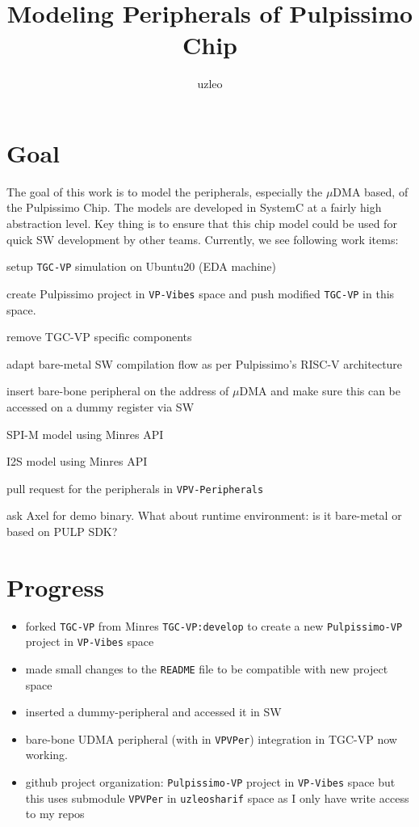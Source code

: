 \documentclass{article}
\title{Modeling Peripherals of Pulpissimo Chip}
\author{uzleo}
\date{}
\newcommand{\cmark}{\ding{51}}%
\newcommand{\done}{\rlap{$\square$}{\raisebox{2pt}{\large\hspace{1pt}\cmark}}%
\hspace{-2.5pt}}
\begin{document}
\maketitle


\section{Goal}
The goal of this work is to model the peripherals, especially the $\mu$DMA based, of the Pulpissimo Chip.
The models are developed in SystemC at a fairly high abstraction level. Key thing is to ensure that this
chip model could be used for quick SW development by other teams. Currently, we see following work items:

\begin{todolist}
 \item[\done] setup \texttt{TGC-VP} simulation on Ubuntu20 (EDA machine)
 \item[\done] create Pulpissimo project in \texttt{VP-Vibes} space and push modified \texttt{TGC-VP} in this space.
 \item remove TGC-VP specific components
 \item[\done] adapt bare-metal SW compilation flow as per Pulpissimo's RISC-V architecture
 \item[\done] insert bare-bone peripheral on the address of $\mu$DMA and make sure this can be accessed on a
 dummy register via SW
 \item SPI-M model using Minres API
 \item I2S model using Minres API
 \item[\done] pull request for the peripherals in \texttt{VPV-Peripherals}
 \item[\done] ask Axel for demo binary. What about runtime environment: is it bare-metal or based on PULP SDK?
\end{todolist}

\section{Progress}
\begin{itemize}
 \item forked \texttt{TGC-VP} from Minres \texttt{TGC-VP:develop} to create a new \texttt{Pulpissimo-VP} project in
       \texttt{VP-Vibes} space
 \item made small changes to the \texttt{README} file to be compatible with new project space
 \item inserted a dummy-peripheral and accessed it in SW
 \item bare-bone UDMA peripheral (with in \texttt{VPVPer}) integration in TGC-VP now working.
 \item github project organization: \texttt{Pulpissimo-VP} project in \texttt{VP-Vibes} space but this uses
       submodule \texttt{VPVPer} in \texttt{uzleosharif} space as I only have write access to my repos
\end{itemize}
\end{document}
